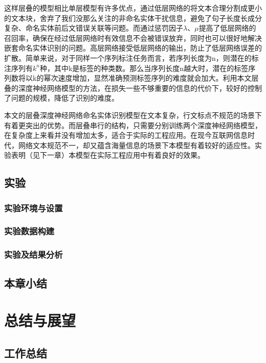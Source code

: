 \documentclass[winfonts,master,oneside,nobackinfo]{njuthesis}
\begin{document}
这样层叠的模型相比单层模型有许多优点，通过低层网络的将文本合理分割成更小的文本块，舍弃了我们没那么关注的非命名实体干扰信息，避免了句子长度长成分复杂、命名实体前后文错误关联等问题。而通过惩罚因子$\lambda$、$\mu$提高了低层网络的召回率，确保在经过低层网络时有效信息不会被错误放弃，同时也可以很好地解决嵌套命名实体识别的问题。高层网络接受低层网络的输出，防止了低层网络误差的扩散。简单来说，对于同样一个序列标注任务而言，若序列长度为n，则潜在的标注序列有$k^n$种，其中k是标签的种类数。那么当序列长度n越大时，潜在的标签序列数将以k的幂次速度增加，显然准确预测标签序列的难度就会加大。利用本文层叠的深度神经网络模型的方法，在损失一些不够重要的信息的代价下，较好的控制了问题的规模，降低了识别的难度。

本文的层叠深度神经网络命名实体识别模型在文本复杂，行文标点不规范的场景下有着更突出的优势。而层叠串行的结构，只需要分别训练两个深度神经网络模型，在复杂度上来看并没有增加太多，适合于实际的工程应用。在现今互联网信息时代，网络文本规范不一，却又蕴含海量信息的场景下本模型有着较好的适应性。实验表明（见下一章）本模型在实际工程应用中有着良好的效果。

\section{实验}

\subsection{实验环境与设置}

\subsection{实验数据构建}

\subsection{实验及结果分析}

\section{本章小结}


\chapter{总结与展望}

\section{工作总结}
\end{document}
